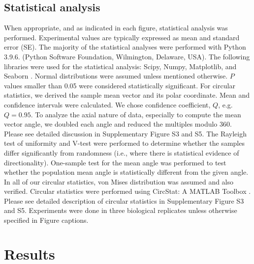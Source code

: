 \documentclass[review]{elsarticle}
\begin{document}
\subsection{Statistical analysis}
When appropriate, and as indicated in each figure, statistical analysis was performed. Experimental values are typically expressed as mean and standard error (SE). The majority of the statistical analyses were performed with Python 3.9.6. (Python Software Foundation, Wilmington, Delaware, USA). The following libraries were used for the statistical analysis: Scipy, Numpy, Matplotlib, and Seaborn \cite{5725236, hunter2007,Virtanen2020}. Normal distributions were assumed unless mentioned otherwise. $P$ values smaller than 0.05 were considered statistically significant. For circular statistics, we derived the sample mean vector and its polar coordinate. Mean and confidence intervals were calculated. We chose confidence coefficient, $Q$, e.g. $Q = 0.95$. To analyze the axial nature of data, especially to compute the mean vector angle, we doubled each angle and reduced the multiples modulo 360\degree. Please see detailed discussion in Supplementary Figure S3 and S5. The Rayleigh test of uniformity and V-test were performed to determine whether the samples differ significantly from randomness (i.e., where there is statistical evidence of directionality). One-sample test for the mean angle was performed to test whether the population mean angle is statistically different from the given angle. In all of our circular statistics, von Mises distribution was assumed and also verified. Circular statistics were performed using CircStat: A MATLAB Toolbox \cite{Berens2009, Berens2009a}. Please see detailed description of circular statistics in Supplementary Figure S3 and S5. Experiments were done in three biological replicates unless otherwise specified in Figure captions.



\section{Results}
\end{document}
